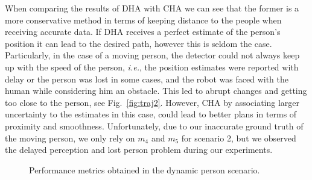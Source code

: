 When comparing the results of DHA with CHA we can see that the former is a more conservative method in terms of keeping distance to the people when receiving accurate data. If DHA receives a perfect estimate of the person's position it can lead to the desired path, however this is seldom the case. Particularly, in the case of a moving person, the detector could not always keep up with the speed of the person, \textit{i.e.}, the position estimates were reported with delay or the person was lost in some cases, and the robot was faced with the human while considering him an obstacle. This led to abrupt changes and getting too close to the person, see Fig.~\ref{fig:traj2}. However, CHA by associating larger uncertainty to the estimates in this case, could lead to better plans in terms of proximity and smoothness. Unfortunately, due to our inaccurate ground truth of the moving person, we only rely on $m_{4}$ and $m_{5}$ for scenario 2, but we observed the delayed perception and lost person problem during our experiments. 




\begin{figure}[!]
\centering
{}%
\hspace{0.1cm}
%

\caption{Performance metrics obtained in the dynamic person scenario. %
}
\label{fig:boxplots_singlePersonMov}
\end{figure}

